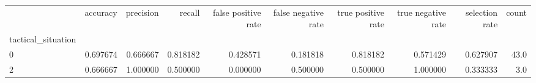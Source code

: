 \begin{tabular}{lrrrrrrrrr}
\toprule
{} &  accuracy &  precision &    recall &  false positive rate &  false negative rate &  true positive rate &  true negative rate &  selection rate &  count \\
tactical\_situation &           &            &           &                      &                      &                     &                     &                 &        \\
\midrule
0                  &  0.697674 &   0.666667 &  0.818182 &             0.428571 &             0.181818 &            0.818182 &            0.571429 &        0.627907 &   43.0 \\
2                  &  0.666667 &   1.000000 &  0.500000 &             0.000000 &             0.500000 &            0.500000 &            1.000000 &        0.333333 &    3.0 \\
\bottomrule
\end{tabular}
